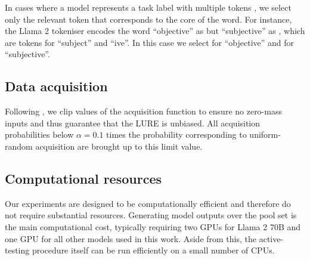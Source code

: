 In cases where a model represents a task label with multiple tokens \citep{kossen2024context}, we select only the relevant token that corresponds to the core of the word.
For instance, the Llama 2 tokeniser encodes the word ``objective'' as \opus{[12091]} but ``subjective'' as \opus{[4967, 573]}, which are tokens for ``subject'' and ``ive''.
In this case we select \opus{[12091]} for ``objective'' and  \opus{[4967]} for ``subjective''.


\subsection{Data acquisition}

Following \citet{kossen2021active}, we clip values of the acquisition function to ensure no zero-mass inputs and thus guarantee that the LURE is unbiased.
All acquisition probabilities below $\alpha=0.1$ times the probability corresponding to uniform-random acquisition are brought up to this limit value.


\subsection{Computational resources}\label{sec:computational_resources}

Our experiments are designed to be computationally efficient and therefore do not require substantial resources.
Generating model outputs over the pool set is the main computational cost, typically requiring two GPUs for Llama 2 70B and one GPU for all other models used in this work.
Aside from this, the active-testing procedure itself can be run efficiently on a small number of CPUs.